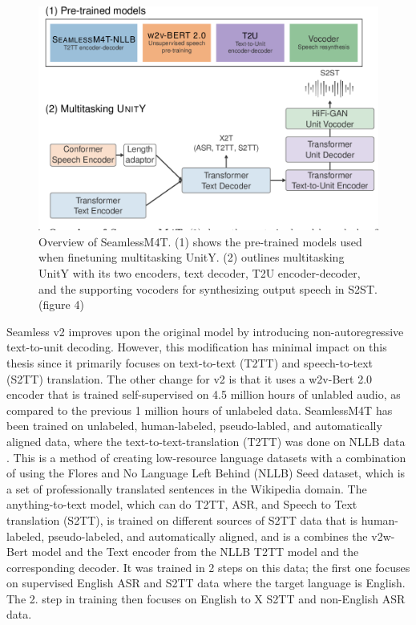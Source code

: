 \begin{figure}
        \centering%
        \includegraphics[width=0.7\linewidth]{Latex//sections/images/seamlessmodel.png}
        \caption{Overview of SeamlessM4T. (1) shows the pre-trained models used when finetuning multitasking UnitY. (2) outlines multitasking UnitY with its two encoders, text decoder, T2U encoder-decoder, and the supporting vocoders for synthesizing output speech in S2ST. \cite{seamless2023}(figure 4)}
        \label{fig:seamlessmodel}
\end{figure}

Seamless v2 improves upon the original model by introducing non-autoregressive text-to-unit decoding. However, this modification has minimal impact on this thesis since it primarily focuses on text-to-text (T2TT) and speech-to-text (S2TT) translation. 
The other change for v2 is that it uses a w2v-Bert 2.0 \cite{chung2021w2vbertcombiningcontrastivelearning} encoder that is trained self-supervised on 4.5 million hours of unlabled audio, as compared to the previous 1 million hours of unlabeled data.
SeamlessM4T has been trained on unlabeled, human-labeled, pseudo-labled, and automatically aligned data, where the text-to-text-translation (T2TT) was done on NLLB data \cite{nllbteam2022languageleftbehindscaling}. This is a method of creating low-resource language datasets with a combination of using the Flores \cite{guzmán2019floresevaluationdatasetslowresource} and No Language Left Behind (NLLB) Seed dataset, which is a set of professionally translated sentences in the Wikipedia domain. 
The anything-to-text model, which can do T2TT, ASR, and Speech to Text translation (S2TT), is trained on different sources of S2TT data that is human-labeled, pseudo-labeled, and automatically aligned, and is a combines the v2w-Bert model and the Text encoder from the NLLB T2TT model and the corresponding decoder.
It was trained in 2 steps on this data; the first one focuses on supervised English ASR and S2TT data where the target language is English. 
The 2. step in training then focuses on English to X S2TT and non-English ASR data.

